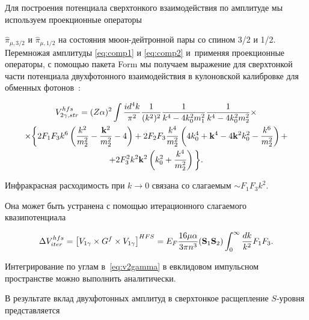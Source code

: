 Для построения потенциала сверхтонкого взаимодействия по амплитуде мы используем проекционные операторы

$\hat \pi_{\mu, 3/2}$ и $\hat \pi_{\mu, 1/2}$ на состояния мюон-дейтронной пары со спином 3/2 и 1/2. Перемножая амплитуды \eqref{eq:comp1} и \eqref{eq:comp2} и~применяя проекционные операторы, с помощью пакета Form \cite{form} мы получаем выражение для сверхтонкой части потенциала двухфотонного взаимодействия в кулоновской калибровке для обменных фотонов~\cite{faustov1}:

\begin{multline}

\label{eq:v2gamma}

V_{2\gamma,str}^{hfs}=(Z\alpha)^2\int\frac{id^4k}{\pi^2}\frac{1}{(k^2)^2}

\frac{1}{k^4-4k_0^2m_1^2}\frac{1}{k^4-4k_0^2m_2^2}\times

\\

\times

\biggl\{2F_1F_3k^6\left(\frac{k^2}{m_2^2}-\frac{{\bf k}^2}{m_2^2}-4\right)

+ 2F_2F_3\frac{k^4}{m_2^2}\left(4k_0^4+{\bf k}^4-4{\bf k}^2k_0^2-\frac{k^6}{m_2^2}\right)+

\\

+2F_3^2k^2{\bf k}^2\left(k_0^2+\frac{k^4}{m_2^2}\right)\biggl\}.

\end{multline}

Инфракрасная расходимость при $k\to 0$ связана со слагаемым $\sim F_1F_3 k^2$.

Она может быть устранена с помощью итерационного слагаемого квазипотенциала

\begin{equation}

\label{eq:2gammaiter}

\Delta V_{iter}^{hfs}=\left[V_{1\gamma}\times G^f\times V_{1\gamma}\right]^{HFS}=

E_F\frac{16\mu\alpha}{3\pi n^3}({\bf S}_1{\bf S}_2)\int_0^\infty\frac{dk}{k^2}F_1F_3.

\end{equation}

Интегрирование по углам в~\eqref{eq:v2gamma} в евклидовом импульсном пространстве можно выполнить аналитически.

В результате вклад двухфотонных амплитуд в сверхтонкое расщепление $S$-уровня представляется

